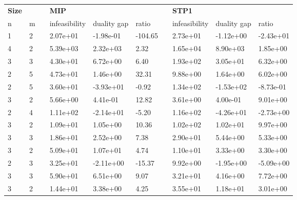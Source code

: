 \documentclass[a4paper,10 pt,titlepage,twoside]{book}
\theoremstyle{plain}
\theoremstyle{definition}
\theoremstyle{remark}
\begin{document}
\begin{table}[!h]
	\begin{tabular}{llllllllll}
		\hline
		\textbf{Size} &  &  & \textbf{MIP}&&  &  & \multicolumn{3}{l}{\textbf{      STP1}} \\ \cline{1-2} \cline{4-6} \cline{8-10} 
		n & m &  & infeasibility & duality gap & ratio &  & infeasibility & duality gap & ratio \\ \hline
		1 & 2 &  & 2.07e+01 & -1.98e-01 & -104.65 &  & 2.73e+01 & -1.12e+00 & -2.43e+01 \\
		4 & 2 &  & 5.39e+03 & 2.32e+03 & 2.32 &  & 1.65e+04 & 8.90e+03 & 1.85e+00 \\
		3 & 3 &  & 4.30e+01 & 6.72e+00 & 6.40 &  & 1.93e+02 & 3.05e+01 & 6.32e+00 \\
		2 & 5 &  & 4.73e+01 & 1.46e+00 & 32.31 &  & 9.88e+00 & 1.64e+00 & 6.02e+00 \\
		2 & 5 &  & 3.60e+01 & -3.93e+01 & -0.92 &  & 1.34e+02 & -1.53e+02 & -8.73e-01 \\
		3 & 2 &  & 5.66e+00 & 4.41e-01 & 12.82 &  & 3.61e+00 & 4.00e-01 & 9.01e+00 \\
		2 & 4 &  & 1.11e+02 & -2.14e+01 & -5.20 &  & 1.16e+02 & -4.26e+01 & -2.73e+00 \\
		3 & 2 &  & 1.09e+01 & 1.05e+00 & 10.36 &  & 1.02e+02 & 1.02e+01 & 9.97e+00 \\
		3 & 3 &  & 1.86e+01 & 2.52e+00 & 7.38 &  & 2.90e+01 & 5.44e+00 & 5.33e+00 \\
		3 & 2 &  & 5.09e+01 & 1.07e+01 & 4.74 &  & 1.10e+01 & 3.33e+00 & 3.30e+00 \\
		2 & 3 &  & 3.25e+01 & -2.11e+00 & -15.37 &  & 9.92e+00 & -1.95e+00 & -5.09e+00 \\
		3 & 3 &  & 5.90e+01 & 6.51e+00 & 9.07 &  & 3.21e+01 & 4.16e+00 & 7.72e+00 \\
		3 & 2 &  & 1.44e+01 & 3.38e+00 & 4.25 &  & 3.55e+01 & 1.18e+01 & 3.01e+00 \\

\end{tabular}
\end{table}
\end{document}
